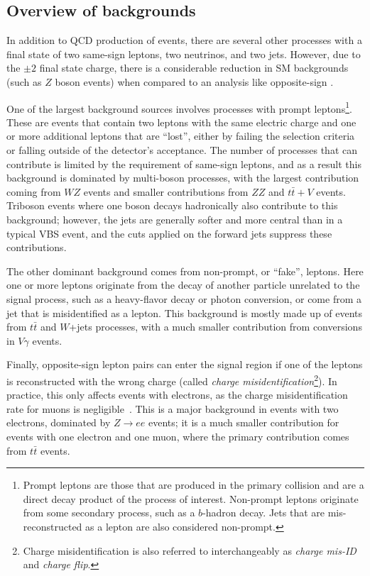 \subsection{Overview of backgrounds}\label{ssww13tev:background_overview}
In addition to QCD production of \ssww events, there are several other processes with a final state of two same-sign leptons, two neutrinos, and two jets.
However, due to the $\pm 2$ final state charge, there is a considerable reduction in SM backgrounds (such as $Z$ boson events) when compared to an analysis like opposite-sign \oswwjj.

One of the largest background sources involves processes with prompt leptons\footnote{Prompt leptons are those that are produced in the primary collision and are a direct decay product of the process of interest.  Non-prompt leptons originate from some secondary process, such as a $b$-hadron decay.  Jets that are mis-reconstructed as a lepton are also considered non-prompt.}.
These are events that contain two leptons with the same electric charge and one or more additional leptons that are ``lost'', either by failing the selection criteria or falling outside of the detector's acceptance.
The number of processes that can contribute is limited by the requirement of same-sign leptons, and as a result this background is dominated by multi-boson processes, with the largest contribution coming from $WZ$ events and smaller contributions from $ZZ$ and $t\bar{t}+V$ events.
Triboson events where one boson decays hadronically also contribute to this background; however, the jets are generally softer and more central than in a typical VBS event, and the cuts applied on the forward jets suppress these contributions.

The other dominant background comes from non-prompt, or ``fake'', leptons.
Here one or more leptons originate from the decay of another particle unrelated to the signal process, such as a heavy-flavor decay or photon conversion, or come from a jet that is misidentified as a lepton.
This background is mostly made up of events from $t\bar{t}$ and $W$+jets processes, with a much smaller contribution from conversions in $V\gamma$ events. %

Finally, opposite-sign lepton pairs can enter the signal region if one of the leptons is reconstructed with the wrong charge (called \emph{charge misidentification}\footnote{Charge misidentification is also referred to interchangeably as \emph{charge mis-ID} and \emph{charge flip}.}).
In practice, this only affects events with electrons, as the charge misidentification rate for muons is negligible~\cite{2013.muon-flip}.
This is a major background in events with two electrons, dominated by $Z\rightarrow ee$ events; it is a much smaller contribution for events with one electron and one muon, where the primary contribution comes from $t\bar{t}$ events.

%
